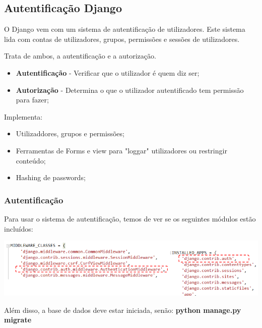 \documentclass{article}
\begin{document}
\subsection{Autentificação Django}

\begin{flushleft}
  O Django vem com um sistema de autentificação de utilizadores.
  Este sistema lida com contas de utilizadores, grupos, permissões e
  sessões de utilizadores.

  \vspace{2mm}

  Trata de ambos, a autentificação e a autorização.
  \begin{itemize}
    \item \textbf{Autentificação} - Verificar que o utilizador é quem diz ser;
    \item \textbf{Autorização} - Determina o que o utilizador autentificado tem permissão para fazer;
  \end{itemize}  

  Implementa:
  \begin{itemize}
    \item Utilizaddores, grupos e permissões;
    \item Ferramentas de Forms e view para "loggar" utilizadores ou restringir conteúdo;
    \item Hashing de passwords;
  \end{itemize}
\end{flushleft}

\subsubsection{Autentificação}

\begin{flushleft}
  Para usar o sistema de autentificação, temos de ver se os seguintes
  módulos estão incluídos:

  \begin{center}
    \includegraphics[scale=0.35]{22}
  \end{center}

  Além disso, a base de dados deve estar iniciada, senão: \textbf{python manage.py migrate}
\end{flushleft}
\end{document}
